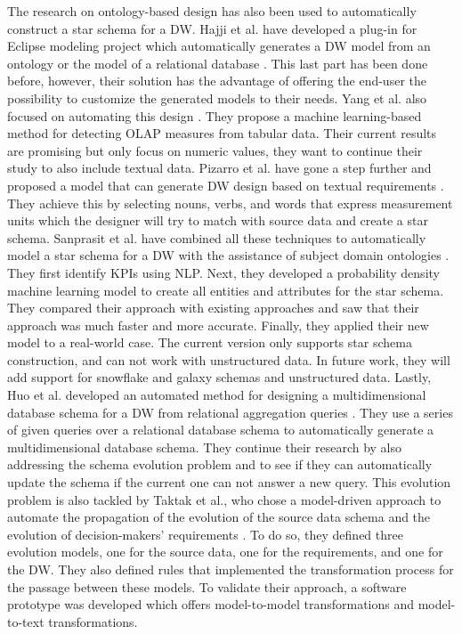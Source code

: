 \documentclass[11pt]{article}
\begin{document}
The research on ontology-based design has also been used to automatically construct a star schema for a DW. Hajji et al. have developed a plug-in for Eclipse modeling project which automatically generates a DW model from an ontology or the model of a relational database \cite{Hajji2020613}. This last part has been done before, however, their solution has the advantage of offering the end-user the possibility to customize the generated models to their needs. Yang et al. also focused on automating this design \cite{Yang2022173}. They propose a machine learning-based method for detecting OLAP measures from tabular data. Their current results are promising but only focus on numeric values, they want to continue their study to also include textual data. Pizarro et al. have gone a step further and proposed a model that can generate DW design based on textual requirements \cite{Pizarro202213}. They achieve this by selecting nouns, verbs, and words that express measurement units which the designer will try to match with source data and create a star schema. Sanprasit et al. have combined all these techniques to automatically model a star schema for a DW with the assistance of subject domain ontologies \cite{Sanprasit2021, Sanprasit2021518}. They first identify KPIs using NLP. Next, they developed a probability density machine learning model to create all entities and attributes for the star schema. They compared their approach with existing approaches and saw that their approach was much faster and more accurate. Finally, they applied their new model to a real-world case. The current version only supports star schema construction, and can not work with unstructured data. In future work, they will add support for snowflake and galaxy schemas and unstructured data. Lastly, Huo et al. developed an automated method for designing a multidimensional database schema for a DW from relational aggregation queries \cite{Huo2020337}. They use a series of given queries over a relational database schema to automatically generate a multidimensional database schema. They continue their research by also addressing the schema evolution problem and to see if they can automatically update the schema if the current one can not answer a new query. This evolution problem is also tackled by Taktak et al., who chose a model-driven approach to automate the propagation of the evolution of the source data schema and the evolution of decision-makers' requirements \cite{Taktak2018401}. To do so, they defined three evolution models, one for the source data, one for the requirements, and one for the DW. They also defined rules that implemented the transformation process for the passage between these models. To validate their approach, a software prototype was developed which offers model-to-model transformations and model-to-text transformations. \\
\end{document}
